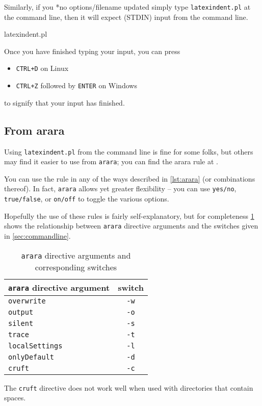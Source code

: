 	Similarly, if you%
	*{no options/filename updated} simply type \texttt{latexindent.pl} at the command line, then it will expect (STDIN) input from the command line.
	\begin{commandshell}
latexindent.pl
      \end{commandshell}

	Once you have finished typing your input, you can press \begin{itemize} \item \texttt{CTRL+D} on Linux
		\item \texttt{CTRL+Z} followed by \texttt{ENTER} on Windows \end{itemize} to signify that your input has finished.

\subsection{From arara}
	\label{sec:arara}
	Using \texttt{latexindent.pl} from the command line is fine for some folks, but others may find it easier to use from \texttt{arara}; you can find the arara rule at \cite{paulo}.

	You can use the rule in any of the ways described in \cref{lst:arara} (or combinations thereof).
	In fact, \texttt{arara} allows yet greater flexibility -- you can use \texttt{yes/no}, \texttt{true/false}, or \texttt{on/off} to toggle the various options.


	Hopefully the use of these rules is fairly self-explanatory, but for completeness \cref{tab:orbsandswitches} shows the relationship between \texttt{arara} directive arguments and the switches given in \cref{sec:commandline}.

	\begin{table}[!ht]
		\centering
		\caption{\texttt{arara} directive arguments and corresponding switches}
		\label{tab:orbsandswitches}
		\begin{tabular}{lc}
			\toprule
			\texttt{arara} directive argument & switch      \\
			\midrule
			\texttt{overwrite}                & \texttt{-w} \\
			\texttt{output}                   & \texttt{-o} \\
			\texttt{silent}                   & \texttt{-s} \\
			\texttt{trace}                    & \texttt{-t} \\
			\texttt{localSettings}            & \texttt{-l} \\
			\texttt{onlyDefault}              & \texttt{-d} \\
			\texttt{cruft}                    & \texttt{-c} \\
			\bottomrule
		\end{tabular}
	\end{table}

	The \texttt{cruft} directive does not work well when used with directories that contain spaces.

